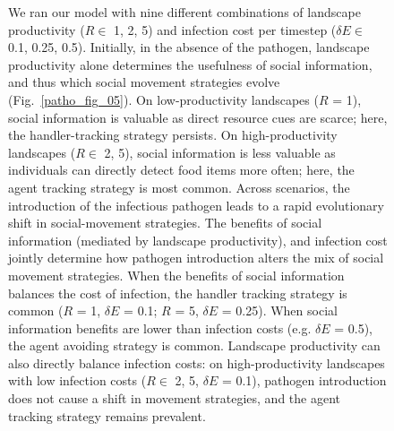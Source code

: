 \begin{figure}[!h]
We ran our model with nine different combinations of landscape productivity ($R \in $ 1, 2, 5) and infection cost per timestep ($\delta E \in$ 0.1, 0.25, 0.5).
Initially, in the absence of the pathogen, landscape productivity alone determines the usefulness of social information, and thus which social movement strategies evolve (Fig.~\ref{patho_fig_05}).
On low-productivity landscapes ($R$ = 1), social information is valuable as direct resource cues are scarce; here, the handler-tracking strategy persists.
On high-productivity landscapes ($R \in$ 2, 5), social information is less valuable as individuals can directly detect food items more often; here, the agent tracking strategy is most common.
Across scenarios, the introduction of the infectious pathogen leads to a rapid evolutionary shift in social-movement strategies.
The benefits of social information (mediated by landscape productivity), and infection cost jointly determine how pathogen introduction alters the mix of social movement strategies.
When the benefits of social information balances the cost of infection, the handler tracking strategy is common ($R$ = 1, $\delta E$ = 0.1; $R$ = 5, $\delta E$ = 0.25).
When social information benefits are lower than infection costs (e.g. $\delta E$ = 0.5), the agent avoiding strategy is common.
Landscape productivity can also directly balance infection costs: on high-productivity landscapes with low infection costs ($R \in$ 2, 5, $\delta E$ = 0.1), pathogen introduction does not cause a shift in movement strategies, and the agent tracking strategy remains prevalent.


\end{figure}
